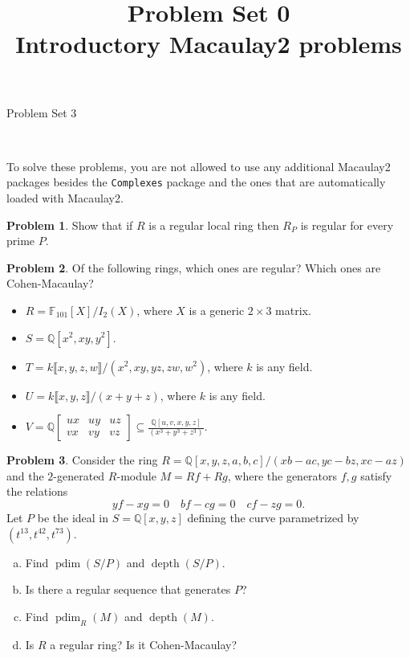 \documentclass[11pt]{article}
\title{}
\date{\vspace{-0.5in}}
\title{Problem Set 0 \\ Introductory Macaulay2 problems}
\DeclareMathOperator{\depth}{depth}
\DeclareMathOperator{\pdim}{pdim}
\theoremstyle{definition}
\newtheorem{problem}{Problem}
\begin{document}
\thispagestyle{fancy}
\pagestyle{fancy}


\begin{center}
	{\LARGE Problem Set 3\\
	
	
}
\end{center}

\

To solve these problems, you are not allowed to use any additional Macaulay2 packages besides the \texttt{Complexes} package and the ones that are automatically loaded with Macaulay2.

\begin{problem}
	Show that if $R$ is a regular local ring then $R_P$ is regular for every prime $P$.
\end{problem}



\begin{problem}
	Of the following rings, which ones are regular? Which ones are Cohen-Macaulay?
	\begin{itemize}
		\item $R = \mathbb{F}_{101}[ X ]/I_2(X)$, where $X$ is a generic $2 \times 3$ matrix.
		\item $S = \mathbb{Q}[x^2,xy,y^2]$.
		\item $T = k \llbracket x,y,z,w \rrbracket/(x^2,xy,yz,zw,w^2)$, where $k$ is any field.
		\item $U = k \llbracket x,y,z \rrbracket /(x+y+z)$, where $k$ is any field.
		\item $V = \mathbb{Q} \begin{bmatrix} ux & uy & uz \\ vx & vy & vz \end{bmatrix} \subseteq \frac{\mathbb{Q}[u,v,x,y,z]}{(x^3+y^3+z^3)}$.
	\end{itemize}
\end{problem}








\begin{problem}
	Consider the ring $R = \mathbb{Q}[x,y,z,a,b,c]/(xb-ac,yc-bz,xc-az)$ and the $2$-generated $R$-module $M = Rf + Rg$, where the generators $f, g$ satisfy the relations 
		$$yf-xg = 0 \quad bf - cg = 0 \quad cf - zg = 0.$$
		Let $P$ be the ideal in $S = \mathbb{Q}[x,y,z]$ defining the curve parametrized by $(t^{13},t^{42},t^{73})$.

\begin{enumerate}[a)]
	\item Find $\pdim(S/P)$ and $\depth(S/P)$.
	\item Is there a regular sequence that generates $P$?
	\item Find $\pdim_R(M)$ and $\depth(M)$.
	\item Is $R$ a regular ring? Is it Cohen-Macaulay?
\end{enumerate}
\end{problem}
\end{document}
